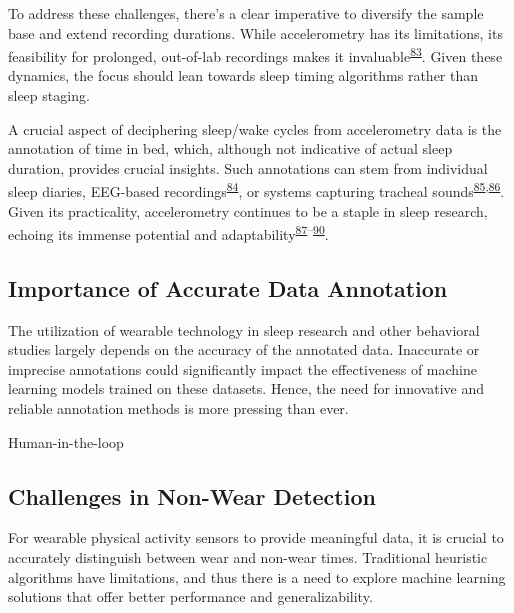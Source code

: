 \documentclass[
  9pt,
]{scrbook}
\begin{document}
To address these challenges, there's a clear imperative to diversify the
sample base and extend recording durations. While accelerometry has its
limitations, its feasibility for prolonged, out-of-lab recordings makes
it
invaluable\textsuperscript{\protect\hyperlink{ref-van_de_water_objective_2011}{83}}.
Given these dynamics, the focus should lean towards sleep timing
algorithms rather than sleep staging.

A crucial aspect of deciphering sleep/wake cycles from accelerometry
data is the annotation of time in bed, which, although not indicative of
actual sleep duration, provides crucial insights. Such annotations can
stem from individual sleep diaries, EEG-based
recordings\textsuperscript{\protect\hyperlink{ref-younes_staging_2016}{84}},
or systems capturing tracheal
sounds\textsuperscript{\protect\hyperlink{ref-dafna_sleep-wake_2015}{85},\protect\hyperlink{ref-montazeri_ghahjaverestan_sleepwakefulness_2020}{86}}.
Given its practicality, accelerometry continues to be a staple in sleep
research, echoing its immense potential and
adaptability\textsuperscript{\protect\hyperlink{ref-hees_novel_2015}{87}--\protect\hyperlink{ref-barouni_ambulatory_2020}{90}}.

\hypertarget{importance-of-accurate-data-annotation}{%
\subsection{Importance of Accurate Data
Annotation}\label{importance-of-accurate-data-annotation}}

The utilization of wearable technology in sleep research and other
behavioral studies largely depends on the accuracy of the annotated
data. Inaccurate or imprecise annotations could significantly impact the
effectiveness of machine learning models trained on these datasets.
Hence, the need for innovative and reliable annotation methods is more
pressing than ever.

Human-in-the-loop

\hypertarget{challenges-in-non-wear-detection}{%
\subsection{Challenges in Non-Wear
Detection}\label{challenges-in-non-wear-detection}}

For wearable physical activity sensors to provide meaningful data, it is
crucial to accurately distinguish between wear and non-wear times.
Traditional heuristic algorithms have limitations, and thus there is a
need to explore machine learning solutions that offer better performance
and generalizability.
\end{document}
